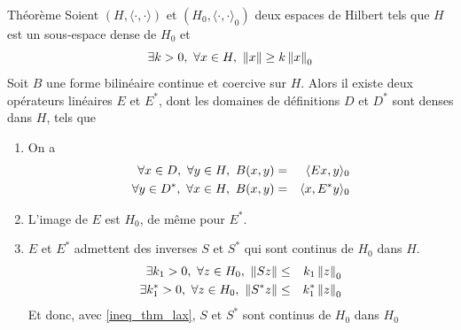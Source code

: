 \begin{frame}
\begin{block}{Théorème}
    Soient $(H, \langle \cdot, \cdot \rangle)$ et $(H_0, \langle \cdot, \cdot \rangle_0)$ deux espaces de Hilbert tels que $H$ est un sous-espace dense de $H_0$ et 
\begin{equation}\label{ineq_thm_lax}
    \exists k >0,\ \forall x \in H, \ \left\lVert x \right\rVert \geq k \left\lVert x \right\rVert_0
\end{equation}
Soit $B$ une forme bilinéaire continue et coercive sur $H$. Alors il existe deux opérateurs linéaires $E$ et $E^*$, dont les domaines de définitions $D$ et $D^*$ sont denses dans $H$, tels que
\begin{enumerate}
    \item[1.] On a
    \begin{eqnarray*}
        \forall x \in D,\ \forall y \in H, \ B(x,y) &=& \langle Ex, y \rangle_0 \\
        \forall y \in D^*,\ \forall x \in H, \ B(x,y) &=& \langle x, E^* y \rangle_0
    \end{eqnarray*}
    \item[2.] L'image de $E$ est $H_0$, de même pour $E^*$.
    \item[3.] $E$ et $E^*$ admettent des inverses $S$ et $S^*$ qui sont continus de $H_0$ dans $H$.
    \begin{eqnarray*}
        \exists k_1>0,\ \forall z \in H_0, \ \left\lVert Sz \right\rVert &\leq& k_1 \left\lVert z \right\rVert_0 \\
        \exists k_1^*>0,\ \forall z \in H_0, \ \left\lVert S^*z \right\rVert &\leq& k_1^* \left\lVert z \right\rVert_0
    \end{eqnarray*}
    Et donc, avec \eqref{ineq_thm_lax}, $S$ et $S^*$ sont continus de $H_0$ dans $H_0$
\end{enumerate}
\end{block}
\end{frame}


